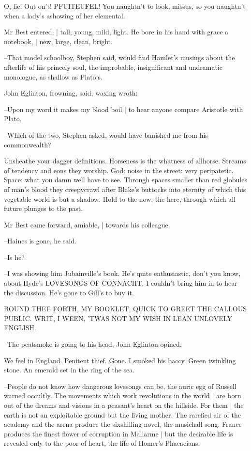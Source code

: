 O, fie!
Out on't!
PFUITEUFEL!
You naughtn't to look,
missus,
so you naughtn't when a lady's ashowing of her elemental.

Mr Best entered, |
tall, young, mild, light.
He bore in his hand with grace a notebook, |
new, large, clean, bright.

--That model schoolboy,
Stephen said,
would find Hamlet's musings about the afterlife of his princely soul,
the improbable,
insignificant and undramatic monologue,
as shallow as Plato's.

John Eglinton,
frowning, said, waxing wroth:

--Upon my word it makes my blood boil |
to hear anyone compare Aristotle with Plato.

--Which of the two,
Stephen asked,
would have banished me from his commonwealth?

Unsheathe your dagger definitions.
Horseness is the whatness of allhorse.
Streams of tendency and eons they worship.
God:
noise in the street:
very peripatetic.
Space:
what you damn well have to see.
Through spaces smaller than red globules of man's blood they creepycrawl after Blake's buttocks into eternity of which this vegetable world is but a shadow.
Hold to the now,
the here,
through which all future plunges to the past.

Mr Best came forward, amiable, |
towards his colleague.

--Haines is gone,
he said.

--Is he?

--I was showing him Jubainville's book.
He's quite enthusiastic,
don't you know,
about Hyde's LOVESONGS OF CONNACHT.
I couldn't bring him in to hear the discussion.
He's gone to Gill's to buy it.


    BOUND THEE FORTH, MY BOOKLET, QUICK
    TO GREET THE CALLOUS PUBLIC.
    WRIT, I WEEN, 'TWAS NOT MY WISH
    IN LEAN UNLOVELY ENGLISH.


--The peatsmoke is going to his head,
John Eglinton opined.

We feel in England.
Penitent thief.
Gone.
I smoked his baccy.
Green twinkling stone.
An emerald set in the ring of the sea.

--People do not know how dangerous lovesongs can be,
the auric egg of Russell warned occultly.
The movements which work revolutions in the world |
are born out of the dreams and visions in a peasant's heart on the hillside.
For them |
the earth is not an exploitable ground but the living mother.
The rarefied air of the academy and the arena produce the sixshilling novel,
the musichall song.
France produces the finest flower of corruption in Mallarme |
but the desirable life is revealed only to the poor of heart,
the life of Homer's Phaeacians.

